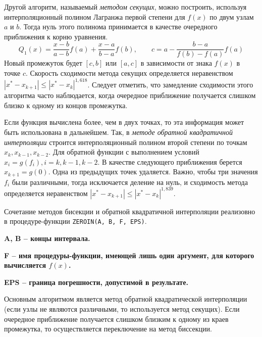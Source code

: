 \documentclass[../../calc-math-exam-2023.tex]{subfiles}
\begin{document}
    Другой алгоритм, называемый \emph{методом секущих}, можно построить, используя интерполяционный полином Лагранжа
    первой степени для $f(x)$ по двум узлам $a$ и $b$. Тогда нуль этого полинома принимается в качестве очередного
    приближения к корню уравнения.
    \begin{equation*}
        Q_1(x) = \frac{x - b}{a - b}f(a) + \frac{x - a}{b - a}f(b), \qquad c = a - \frac{b - a}{f(b) - f(a)}f(a)
    \end{equation*}
    Новый промежуток будет $[c, b]$ или $[a, c]$ в зависимости от знака $f(x)$ в точке $c$. Скорость сходимости метода
    секущих определяется неравенством $\displaystyle \left| x^* - x_{k+1} \right| \leq \left| x^* - x_k \right|^{1,618}$.
    Следует отметить, что замедление сходимости этого алгоритма часто наблюдается, когда очередное приближение
    получается слишком близко к одному из концов промежутка.

    Если функция вычислена более, чем в двух точках, то эта информация может быть использована в дальнейшем. Так, в
    \emph{методе обратной квадратичной интерполяции} строится интерполяционный полином второй степени по точкам
    $x_k, x_{k-1}, x_{k-2}$. Для обратной функции с выполнением условий $\displaystyle x_i = g(f_i), i = k, k-1, k-2$.
    В качестве следующего приближения берется $\displaystyle x_{k+1} = g(0)$. Одна из предыдущих точек удаляется.
    Важно, чтобы три значения $f_i$ были различными, тогда исключается деление на нуль, и сходимость метода определяется
    неравенством $\displaystyle \left| x^* - x_{k+1} \right| \leq \left| x^* - x_k \right|^{1,839}$.
    \vspace{10pt}

    Сочетание методов бисекции и обратной квадратичной интерполяции реализовно в процедуре-функции \verb|ZEROIN(A, B, F, EPS)|.

    \bf{A}, \bf{B} -- концы интервала.

    \bf{F} -- имя процедуры-функции, имеющей лишь один аргумент, для которого вычисляется $f(x)$.

    \bf{EPS} -- граница погрешности, допустимой в результате.
    \vspace{10pt}

    Основным алгоритмом является метод обратной квадратической интерполяции (если узлы не являются различными, то
    используется метод секущих). Если очередное приближение получается слишком близким к одному из краев промежутка, то
    осуществляется переключение на метод биссекции.
\end{document}
